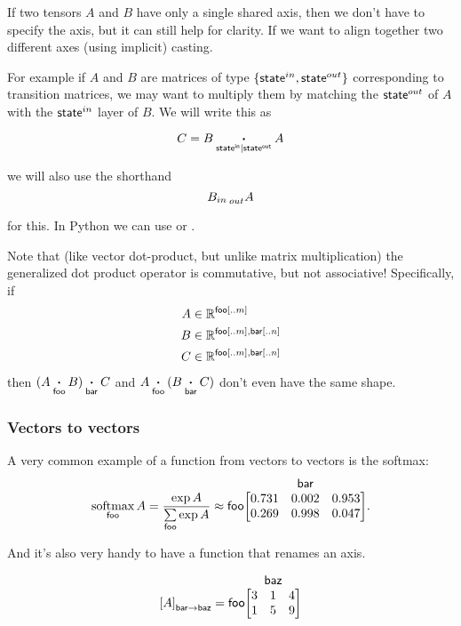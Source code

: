 \documentclass{article}
\makeatletter
\newcommand{\nmatrix}[3]{\name{#1}\begin{array}[b]{@{}c@{}}\name{#2}\\\begin{bmatrix}#3\end{bmatrix}\end{array}}
\makeatother
\begin{document}
If two tensors $A$ and $B$ have only a single shared axis, then we don't have to specify the axis, but it can still help for clarity.
If we want to align together two different axes (using implicit) casting.

For example if $A$ and $B$ are matrices of  type $\{ \mathsf{state}^{in} , \mathsf{state}^{out} \}$ corresponding to transition matrices, we may want to multiply them by matching the $\mathsf{state}^{out}$ of $A$ with the $\mathsf{state}^{in}$ layer of $B$. We will write this as 

\[
  C = B \mathbin{\mathop{\boldsymbol\cdot}\limits_{\mathsf{\mathsf{state}^{in}|\mathsf{state}^{out}}}} A
\]

we will also use the shorthand 
\[
  B_{in}  \prescript{}{out}A
\]

for this. In Python we can use  or .

Note that (like vector dot-product, but unlike matrix multiplication) the generalized dot product operator is commutative, but not associative! Specifically, if
\begin{align*}
A &\in \mathbb{R}^{\mathsf{foo}[..m]} \\
B &\in \mathbb{R}^{\mathsf{foo}[..m],\mathsf{bar}[..n]} \\
C &\in \mathbb{R}^{\mathsf{foo}[..m],\mathsf{bar}[..n]}
\end{align*}
then $(A \mathbin{\mathop{\boldsymbol\cdot}\limits_{\mathsf{foo}}} B) \mathbin{\mathop{\boldsymbol\cdot}\limits_{\mathsf{bar}}} C$ and $A \mathbin{\mathop{\boldsymbol\cdot}\limits_{\mathsf{foo}}} (B \mathbin{\mathop{\boldsymbol\cdot}\limits_{\mathsf{bar}}} C)$ don't even have the same shape.

\subsubsection{Vectors to vectors}

A very common example of a function from vectors to vectors is the softmax:
\begin{equation*}
  \nfun{foo}{softmax} A = \frac{\exp A}{\nsum{foo} \exp A} \approx \nmatrix{foo}{bar}{
    0.731 & 0.002 & 0.953 \\
    0.269 & 0.998 & 0.047
  }.
\end{equation*}

And it's also very handy to have a function that renames an axis.

\begin{equation*}
\nmov{bar}{baz}{A} = \nmatrix{foo}{baz}{
  3 & 1 & 4 \\
  1 & 5 & 9
}
\end{equation*}
\end{document}
